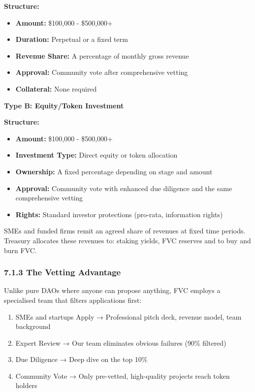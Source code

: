 \documentclass[
  paper=a4,
  ,captions=tableheading
]{scrartcl}
\providecommand{\tightlist}{%
  \setlength{\itemsep}{0pt}\setlength{\parskip}{0pt}}
\begin{document}
\textbf{Structure:}

\begin{itemize}
\tightlist
\item
  \textbf{Amount:} \$100,000 - \$500,000+
\item
  \textbf{Duration:} Perpetual or a fixed term
\item
  \textbf{Revenue Share:} A percentage of monthly gross revenue
\item
  \textbf{Approval:} Community vote after comprehensive vetting
\item
  \textbf{Collateral:} None required
\end{itemize}

\textbf{Type B: Equity/Token Investment}

\textbf{Structure:}

\begin{itemize}
\tightlist
\item
  \textbf{Amount:} \$100,000 - \$500,000+
\item
  \textbf{Investment Type:} Direct equity or token allocation
\item
  \textbf{Ownership:} A fixed percentage depending on stage and amount
\item
  \textbf{Approval:} Community vote with enhanced due diligence and the
  same comprehensive vetting
\item
  \textbf{Rights:} Standard investor protections (pro-rata, information
  rights)
\end{itemize}

SMEs and funded firms remit an agreed share of revenues at fixed time periods. Treasury allocates these revenues to: staking yields, FVC reserves and to buy and burn FVC.

\subsubsection{7.1.3 The Vetting Advantage}\label{the-vetting-advantage}

Unlike pure DAOs where anyone can propose anything, FVC employs a
specialised team that filters applications first:

\begin{enumerate}
\def\labelenumi{\arabic{enumi}.}
\tightlist
\item
  SMEs and startups Apply → Professional
  pitch deck, revenue model, team background
\item
  Expert Review → Our team eliminates obvious failures (90\% filtered)
\item
  Due Diligence → Deep dive on the top 10\%
\item
  Community Vote → Only pre-vetted, high-quality projects reach token
  holders
\end{enumerate}
\end{document}
